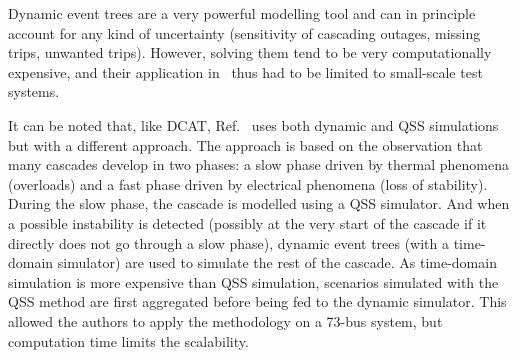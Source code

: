 

Dynamic event trees are a very powerful modelling tool and can in principle account for any kind of uncertainty (sensitivity of cascading outages, missing trips, unwanted trips). However, solving them tend to be very computationally expensive, and their application in~\cite{TwoLevelPSA, Faghihi, PierreMCDETprelim} thus had to be limited to small-scale test systems.


It can be noted that, like DCAT, Ref.~\cite{TwoLevelPSA} uses both dynamic and QSS simulations but with a different approach. The approach is based on the observation that many cascades develop in two phases: a slow phase driven by thermal phenomena (overloads) and a fast phase driven by electrical phenomena (loss of stability). During the slow phase, the cascade is modelled using a QSS simulator. And when a possible instability is detected (possibly at the very start of the cascade if it directly does not go through a slow phase), dynamic event trees (with a time-domain simulator) are used to simulate the rest of the cascade. As time-domain simulation is more expensive than QSS simulation, scenarios simulated with the QSS method are first aggregated before being fed to the dynamic simulator. This allowed the authors to apply the methodology on a 73-bus system, but computation time limits the scalability.

